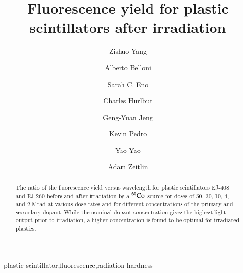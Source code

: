 \documentclass[review]{elsarticle}
\begin{document}
\begin{frontmatter}

\title{Fluorescence yield for plastic scintillators after irradiation }


\author[umd]{Zishuo Yang}
\author[umd]{Alberto Belloni}
\author[umd]{Sarah C. Eno}

\author[eljen]{Charles Hurlbut}
\author[umd]{Geng-Yuan Jeng}
\author[fnal]{Kevin Pedro}
\author[umd]{Yao Yao}
\author[umd]{Adam Zeitlin}



\address[umd]{Dept. Physics, U. Maryland, College Park MD 30742 USA}
\address[eljen]{Eljen Technology, 1300 W. Broadway, Sweetwater, TX 79556 USA}
\address[fnal]{Fermi National Accelerator Laboratory, Batavia, IL, USA}

\begin{abstract}
The ratio of the fluorescence yield versus wavelength for plastic scintillators EJ-408 and EJ-260 before and after irradiation by a $\rm {^{60}Co}$ source for doses of 50, 30, 10, 4, and 2 Mrad at various dose rates and for different concentrations of the primary and secondary dopant.  While the nominal dopant concentration gives the highest light output prior to irradiation, a higher concentration is found to be optimal for irradiated plastics.
\end{abstract}

\begin{keyword}
plastic scintillator\sep fluorescence\sep radiation hardness
\end{keyword}

\end{frontmatter}

\linenumbers
\end{document}
